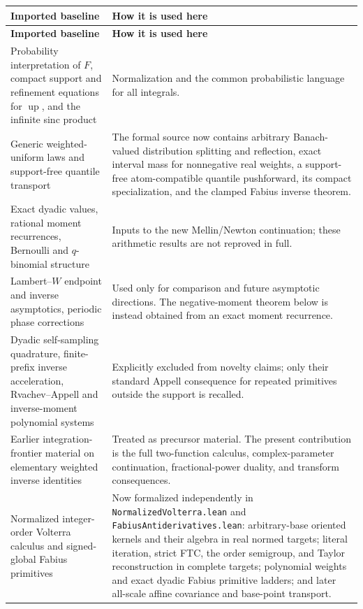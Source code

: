 \documentclass[11pt,oneside]{article}
\theoremstyle{definition}
\newcommand{\F}{F}
\newcommand{\upf}{\operatorname{up}}
\begin{document}
\begin{longtable}{@{}p{}p{}@{}}
\toprule
\textbf{Imported baseline} & \textbf{How it is used here}\\
\midrule
\endfirsthead
\toprule
\textbf{Imported baseline} & \textbf{How it is used here}\\
\midrule
\endhead
Probability interpretation of \(\F\), compact support and refinement equations for
\(\upf\), and the infinite sinc product & Normalization and the common probabilistic
language for all integrals.\\
Generic weighted-uniform laws and support-free quantile transport & The formal source now
contains arbitrary Banach-valued distribution splitting and reflection, exact interval
mass for nonnegative real weights, a support-free atom-compatible quantile pushforward,
its compact specialization, and the clamped Fabius inverse theorem.\\
Exact dyadic values, rational moment recurrences, Bernoulli and \(q\)-binomial structure &
Inputs to the new Mellin/Newton continuation; these arithmetic results are not reproved
in full.\\
Lambert--\(W\) endpoint and inverse asymptotics, periodic phase corrections & Used only
for comparison and future asymptotic directions.  The negative-moment theorem below is
instead obtained from an exact moment recurrence.\\
Dyadic self-sampling quadrature, finite-prefix inverse acceleration, Rvachev--Appell and
inverse-moment polynomial systems & Explicitly excluded from novelty claims; only their
standard Appell consequence for repeated primitives outside the support is recalled.\\
Earlier integration-frontier material on elementary weighted inverse identities & Treated
as precursor material.  The present contribution is the full two-function calculus,
complex-parameter continuation, fractional-power duality, and transform consequences.\\
Normalized integer-order Volterra calculus and signed-global Fabius primitives &
Now formalized independently in \texttt{NormalizedVolterra.lean} and
\texttt{FabiusAntiderivatives.lean}: arbitrary-base oriented kernels and their algebra in
real normed targets; literal iteration, strict FTC, the order semigroup, and Taylor
reconstruction in complete targets; polynomial weights and exact dyadic Fabius primitive
ladders; and later all-scale affine covariance and base-point transport.\\
\bottomrule
\end{longtable}
\end{document}

